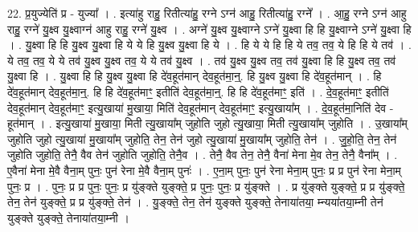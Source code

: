 \documentclass[17pt]{extarticle}
\begin{document}
22. प्र॒युज्येति॑ प्र - युज्या᳚ । . इत्या॑हु राहु॒ रितीत्या॑हु॒ रग्ने ऽग्न॑ आहु॒ रितीत्या॑हु॒ रग्ने᳚ । . आ॒हु॒ रग्ने ऽग्न॑ आहु राहु॒ रग्ने॑ यु॒क्ष्व यु॒क्ष्वाग्न॑ आहु राहु॒ रग्ने॑ यु॒क्ष्व । . अग्ने॑ यु॒क्ष्व यु॒क्ष्वाग्ने ऽग्ने॑ यु॒क्ष्वा हि हि यु॒क्ष्वाग्ने ऽग्ने॑ यु॒क्ष्वा हि । . यु॒क्ष्वा हि हि यु॒क्ष्व यु॒क्ष्वा हि ये ये हि यु॒क्ष्व यु॒क्ष्वा हि ये । . हि ये ये हि हि ये तव॒ तव॒ ये हि हि ये तव॑ । . ये तव॒ तव॒ ये ये तव॑ यु॒क्ष्व यु॒क्ष्व तव॒ ये ये तव॑ यु॒क्ष्व । . तव॑ यु॒क्ष्व यु॒क्ष्व तव॒ तव॑ यु॒क्ष्वा हि हि यु॒क्ष्व तव॒ तव॑ यु॒क्ष्वा हि । . यु॒क्ष्वा हि हि यु॒क्ष्व यु॒क्ष्वा हि दे॑व॒हूत॑मान् देव॒हूत॑मा॒न्॒. हि यु॒क्ष्व यु॒क्ष्वा हि दे॑व॒हूत॑मान् । . हि दे॑व॒हूत॑मान् देव॒हूत॑मा॒न्॒. हि हि दे॑व॒हूत॑माꣳ॒॒ इतीति॑ देव॒हूत॑मा॒न्॒. हि हि दे॑व॒हूत॑माꣳ॒॒ इति॑ । . दे॒व॒हूत॑माꣳ॒॒ इतीति॑ देव॒हूत॑मान् देव॒हूत॑माꣳ॒॒ इत्यु॒खाया॑ मु॒खाया॒ मिति॑ देव॒हूत॑मान् देव॒हूत॑माꣳ॒॒ इत्यु॒खाया᳚म् । . दे॒व॒हूत॑मा॒निति॑ देव - हूत॑मान् । . इत्यु॒खाया॑ मु॒खाया॒ मिती त्यु॒खाया᳚म् जुहोति जुहो त्यु॒खाया॒ मिती त्यु॒खाया᳚म् जुहोति । . उ॒खाया᳚म् जुहोति जुहो त्यु॒खाया॑ मु॒खाया᳚म् जुहोति॒ तेन॒ तेन॑ जुहो त्यु॒खाया॑ मु॒खाया᳚म् जुहोति॒ तेन॑ । . जु॒हो॒ति॒ तेन॒ तेन॑ जुहोति जुहोति॒ तेनै॒ वैव तेन॑ जुहोति जुहोति॒ तेनै॒व । . तेनै॒ वैव तेन॒ तेनै॒ वैना॑ मेना मे॒व तेन॒ तेनै॒ वैना᳚म् । . ए॒वैना॑ मेना मे॒वै वैना॒म् पुनः॒ पुन॑ रेना मे॒वै वैना॒म् पुनः॑ । . ए॒ना॒म् पुनः॒ पुन॑ रेना मेना॒म् पुनः॒ प्र प्र पुन॑ रेना मेना॒म् पुनः॒ प्र । . पुनः॒ प्र प्र पुनः॒ पुनः॒ प्र यु॑ङ्क्ते युङ्क्ते॒ प्र पुनः॒ पुनः॒ प्र यु॑ङ्क्ते । . प्र यु॑ङ्क्ते युङ्क्ते॒ प्र प्र यु॑ङ्क्ते॒ तेन॒ तेन॑ युङ्क्ते॒ प्र प्र यु॑ङ्क्ते॒ तेन॑ । . यु॒ङ्क्ते॒ तेन॒ तेन॑ युङ्क्ते युङ्क्ते॒ तेनाया॑तया॒ म्न्यया॑तया॒म्नी तेन॑ युङ्क्ते युङ्क्ते॒ तेनाया॑तया॒म्नी । \newline
\end{document}
